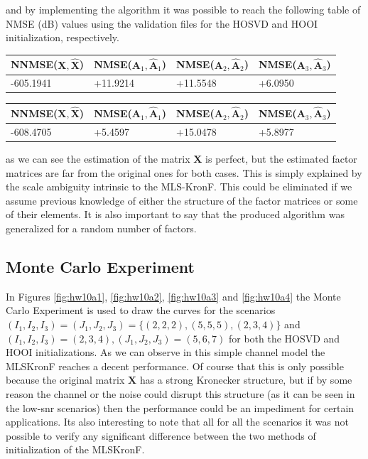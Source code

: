 \documentclass[a4paper,10pt]{article}
\begin{document}
    and by implementing the algorithm it was possible to reach the following table of NMSE (dB) values using the validation files 
    for the HOSVD and HOOI initialization, respectively.

    \begin{table}[ht!]
        \centering
        \begin{tabular}{|l|l|l|l|}
        \hline
        NNMSE($\boldsymbol{X}, \boldsymbol{\hat{X}}$) & NMSE($\boldsymbol{A}_{1}, \boldsymbol{\hat{A}}_{1}$) & NMSE($\boldsymbol{A}_{2}, \boldsymbol{\hat{A}}_{2}$) & NMSE($\boldsymbol{A}_{3}, \boldsymbol{\hat{A}}_{3}$) \\ \hline
        -605.1941 & +11.9214 & +11.5548 & +6.0950 \\ \hline
        \end{tabular}
    \end{table}

    \begin{table}[ht!]
        \centering
        \begin{tabular}{|l|l|l|l|}
        \hline
        NNMSE($\boldsymbol{X}, \boldsymbol{\hat{X}}$) & NMSE($\boldsymbol{A}_{1}, \boldsymbol{\hat{A}}_{1}$) & NMSE($\boldsymbol{A}_{2}, \boldsymbol{\hat{A}}_{2}$) & NMSE($\boldsymbol{A}_{3}, \boldsymbol{\hat{A}}_{3}$) \\ \hline
        -608.4705 & +5.4597 & +15.0478 & +5.8977 \\ \hline
        \end{tabular}
    \end{table}

    as we can see the estimation of the matrix $\boldsymbol{X}$ is perfect, but the estimated factor matrices are far from the original ones for both cases. This is simply explained by 
    the scale ambiguity intrinsic to the MLS-KronF. This could be eliminated if we assume previous knowledge of either the structure of the factor matrices or some of their elements.
    It is also important to say that the produced algorithm was generalized for a random number of factors.

    \subsection*{Monte Carlo Experiment}

    In Figures \ref{fig:hw10a1}, \ref{fig:hw10a2}, \ref{fig:hw10a3} and \ref{fig:hw10a4} the Monte Carlo Experiment is used to draw the curves for the scenarios 
    $(I_{1},I_{2},I_{3}) = (J_{1},J_{2},J_{3}) = \{(2,2,2), (5,5,5), (2,3,4)\}$ and $(I_{1},I_{2},I_{3}) = (2,3,4), (J_{1},J_{2},J_{3}) = (5,6,7)$ for both the HOSVD and HOOI initializations. 
    As we can observe in  this simple channel model the MLSKronF reaches a decent performance. Of course that this is only possible because the original matrix $\boldsymbol{X}$ has a strong 
    Kronecker structure, but if by some reason the channel or the noise could disrupt this structure (as it can be seen in the low-snr scenarios) then the performance could be an impediment for certain applications.
    Its also interesting to note that all for all the scenarios it was not possible to verify any significant difference between the two methods of initialization of the MLSKronF.
\end{document}
